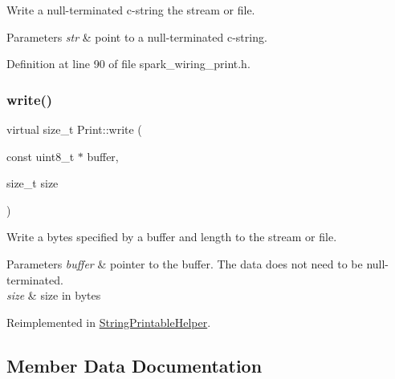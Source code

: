 Write a null-\/terminated c-\/string the stream or file. 


\begin{DoxyParams}{Parameters}
{\em str} & point to a null-\/terminated c-\/string. \\
\hline
\end{DoxyParams}


Definition at line 90 of file spark\+\_\+wiring\+\_\+print.\+h.

\mbox{\label{class_print_a88864e109589a5be9b0f5ba1327f8421}} 
\subsubsection{\texorpdfstring{write()}{write()}\hspace{0.1cm}{\footnotesize\ttfamily [6/6]}}
{\footnotesize\ttfamily virtual size\+\_\+t Print\+::write (\begin{DoxyParamCaption}\item[{const uint8\+\_\+t $\ast$}]{buffer,  }\item[{size\+\_\+t}]{size }\end{DoxyParamCaption})\hspace{0.3cm}{\ttfamily [virtual]}}



Write a bytes specified by a buffer and length to the stream or file. 


\begin{DoxyParams}{Parameters}
{\em buffer} & pointer to the buffer. The data does not need to be null-\/terminated. \\
\hline
{\em size} & size in bytes \\
\hline
\end{DoxyParams}


Reimplemented in \hyperlink{class_string_printable_helper_a8098bfb565b518cec0cf9e6fbc68eed8}{String\+Printable\+Helper}.



\subsection{Member Data Documentation}
\mbox{\label{class_print_ae922182b62afa3b8434397b7a54e70c4}} 
